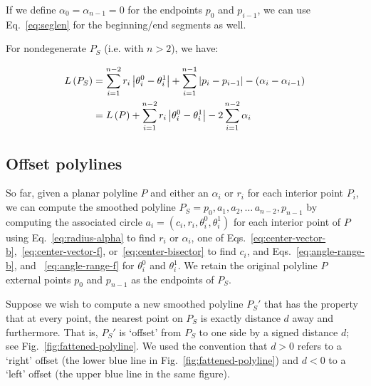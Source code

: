 \documentclass{article}
\begin{document}
If we define $\alpha_0 = \alpha_{n-1} = 0$ for the endpoints $p_0$ and $p_{i-1}$, we can use Eq.~\eqref{eq:seglen} for the beginning/end segments as well.

For nondegenerate $P_S$ (i.e. with $n>2$), we have:

\begin{align}
  \notag
  L\left(P_S\right) &= \sum^{n-2}_{i = 1} r_i\left|\theta^0_i - \theta^1_i\right| + \sum^{n-1}_{i=1} \left|p_i - p_{i-1}\right| - (\alpha_i - \alpha_{i-1})\\
  \label{eq:smoothpoly-len}
  &= L\left(P\right) + \sum^{n-2}_{i = 1} r_i\left|\theta^0_i - \theta^1_i\right| - 2\sum^{n-2}_{i=1} \alpha_i
\end{align}

\subsection{\label{sec:offset-polylines}Offset polylines}

So far, given a planar polyline $P$ and either an $\alpha_i$ or $r_i$ for each interior point $P_i$, we can compute the smoothed polyline $P_S = p_0, a_1, a_2,\ldots\,a_{n-2}, p_{n-1}$ by computing the associated circle $a_i=\left(c_i, r_i, \theta^0_i, \theta^1_i\right)$ for each interior point of $P$ using Eq.~\eqref{eq:radius-alpha} to find $r_i$ or $\alpha_i$, one of Eqs.~\eqref{eq:center-vector-b},~\eqref{eq:center-vector-f}, or~\eqref{eq:center-bisector} to find $c_i$, and Eqs.~\eqref{eq:angle-range-b}, and ~\eqref{eq:angle-range-f} for $\theta^0_i$ and $\theta^1_i$.  We retain the original polyline $P$ external points $p_0$ and $p_{n-1}$ as the endpoints of $P_S$.

Suppose we wish to compute a new smoothed polyline $P_S'$ that has the property that at every point, the nearest point on $P_S$ is exactly distance $d$ away and furthermore.  That is, $P_S'$ is `offset' from $P_S$ to one side by a signed distance $d$; see Fig.~\ref{fig:fattened-polyline}.  We used the convention that $d>0$ refers to a `right' offset (the lower blue line in Fig.~\ref{fig:fattened-polyline}) and $d<0$ to a `left' offset (the upper blue line in the same figure).
\end{document}
